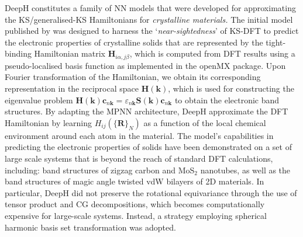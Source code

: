 DeepH constitutes a family of NN models that were developed for approximating the KS/generalised-KS Hamiltonians for \emph{crystalline materials.} The initial model published by \citet{Li2022-ie} was designed to harness the `\emph{near-sightedness}' of KS-DFT to predict the electronic properties of crystalline solids that are represented by the tight-binding Hamiltonian matrix $\bm{H}_{i\alpha,j\beta}$, which is computed from DFT results using a pseudo-localised basis function as implemented in the openMX\cite{ozaki2003variationally,ozaki2004numerical} package. Upon Fourier transformation of the Hamiltonian, we obtain its corresponding representation in the reciprocal space $\bm{H}(\bm{k})$, which is used for constructing the eigenvalue problem $\bm{H}(\bm{k})\bm{c}_{n\bm{k}}=\varepsilon_{n\bm{k}}\bm{S}(\bm{k})\bm{c}_{n\bm{k}}$ to obtain the electronic band structures. By adapting the MPNN architecture, DeepH approximate the DFT Hamiltonian by learning $H_{ij}(\{\bm{R}\}_{N})$ as a function of the local chemical environment around each atom in the material. The model's capabilities in predicting the electronic properties of solids have been demonstrated on a set of large scale systems that is beyond the reach of standard DFT calculations, including: band structures of zigzag carbon and MoS$_{2}$ nanotubes, as well as the band structures of magic angle twisted vdW bilayers of 2D materials. In particular, DeepH did not preserve the rotational equivariance through the use of tensor product and CG decompositions, which becomes computationally expensive for large-scale systems. Instead, a strategy employing spherical harmonic basis set transformation was adopted.

